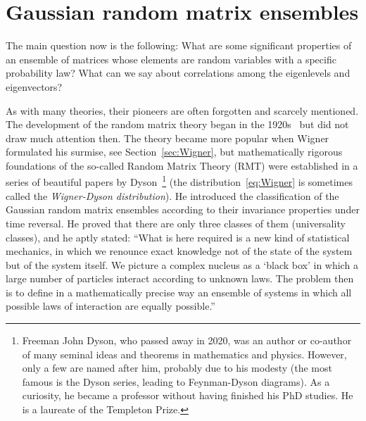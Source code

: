 \documentclass[a4paper,11pt,twoside]{article}
\begin{document}
\section{Gaussian random matrix ensembles}
    The main question now is the following: 
    What are some significant properties of an ensemble of matrices whose elements are random variables with a specific probability law? 
    What can we say about correlations among the eigenlevels and eigenvectors?
    
    As with many theories, their pioneers are often forgotten and scarcely mentioned. 
    The development of the random matrix theory began in the 1920s~\cite{Wis28} but did not draw much attention then.
    The theory became more popular when Wigner formulated his surmise, see Section~\ref{sec:Wigner},
    but mathematically rigorous foundations of the so-called Random Matrix Theory (RMT) were established in a series of beautiful papers by Dyson~\cite{Dys62}\footnote{
        Freeman John Dyson, who passed away in 2020, was an author or co-author of many seminal ideas and theorems in mathematics and physics. However, only a few are named after him, probably due to his modesty (the most famous is the Dyson series, leading to Feynman-Dyson diagrams). As a curiosity, he became a professor without having finished his PhD studies.
        He is a laureate of the Templeton Prize.
    }
    (the distribution~\eqref{eq:Wigner} is sometimes called the \emph{Wigner-Dyson distribution}).
    He introduced the classification of the Gaussian random matrix ensembles according to their invariance properties under time reversal. He proved that there are only three classes of them (universality classes), and he aptly stated: ``What is here required is a new kind of statistical mechanics, in which we renounce exact knowledge not of the state of the system but of the system itself.
    We picture a complex nucleus as a `black box' in which a large number of particles interact according to unknown laws.
    The problem then is to define in a mathematically precise way an ensemble of systems in which all possible laws of interaction are equally possible.''
\end{document}
